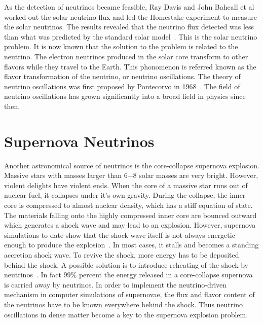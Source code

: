 As the detection of neutrinos became feasible, Ray Davis and John Bahcall et al worked out the solar neutrino flux and led the Homestake experiment to measure the solar neutrinos. The results revealed that the neutrino flux detected was less than what was predicted by the standard solar model~\cite{Bahcall1973}. This is the solar neutrino problem. It is now known that the solution to the problem is related to the neutrino. The electron neutrinos produced in the solar core transform to other flavors while they travel to the Earth. This phonomenon is referred known as the flavor transformation of the neutrino, or neutrino oscillations. The theory of neutrino oscillations was first proposed by Pontecorvo in 1968~\cite{Pontecorvo1968}. The field of neutrino oscillations has grown significantly into a broad field in physics since then.



\section{Supernova Neutrinos}


Another astronomical source of neutrinos is the core-collapse supernova explosion. Massive stars with masses larger than 6−8 solar masses are very bright. However, violent delights have violent ends. When the core of a massive star runs out of nuclear fuel, it collapses under it's own gravity. During the collapse, the inner core is compressed to almost nuclear density, which has a stiff equation of state. The materials falling onto the highly compressed inner core are bounced outward which generates a shock wave and may lead to an explosion. However, supernova simulations to date show that the shock wave itself is not always energetic enough to produce the explosion~\cite{Janka2016b}. In most cases, it stalls and becomes a standing accretion shock wave. To revive the shock, more energy has to be deposited behind the shock. A possible solution is to introduce reheating of the shock by neutrinos~\cite{Janka2016b}. In fact 99\% percent the energy released in a core-collapse supernova is carried away by neutrinos.
In order to implement the neutrino-driven mechanism in computer simulations of supernovae, the flux and flavor content of the neutrinos have to be known everywhere behind the shock. Thus neutrino oscillations in dense matter become a key to the supernova explosion problem.

